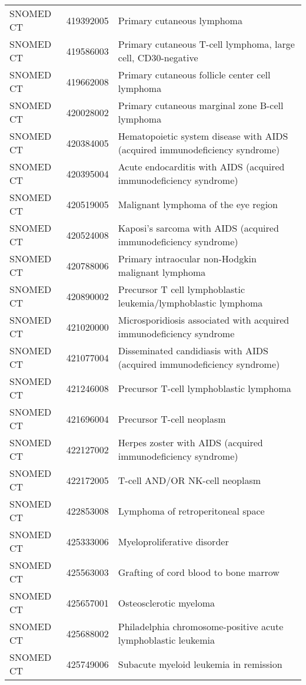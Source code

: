 \begin{table}[ht]
\begin{tabular}{lll}
  SNOMED CT & 419392005 & Primary cutaneous lymphoma \\ 
  SNOMED CT & 419586003 & Primary cutaneous T-cell lymphoma, large cell, CD30-negative \\ 
  SNOMED CT & 419662008 & Primary cutaneous follicle center cell lymphoma \\ 
  SNOMED CT & 420028002 & Primary cutaneous marginal zone B-cell lymphoma \\ 
  SNOMED CT & 420384005 & Hematopoietic system disease with AIDS (acquired immunodeficiency syndrome) \\ 
  SNOMED CT & 420395004 & Acute endocarditis with AIDS (acquired immunodeficiency syndrome) \\ 
  SNOMED CT & 420519005 & Malignant lymphoma of the eye region \\ 
  SNOMED CT & 420524008 & Kaposi's sarcoma with AIDS (acquired immunodeficiency syndrome) \\ 
  SNOMED CT & 420788006 & Primary intraocular non-Hodgkin malignant lymphoma \\ 
  SNOMED CT & 420890002 & Precursor T cell lymphoblastic leukemia/lymphoblastic lymphoma \\ 
  SNOMED CT & 421020000 & Microsporidiosis associated with acquired immunodeficiency syndrome \\ 
  SNOMED CT & 421077004 & Disseminated candidiasis with AIDS (acquired immunodeficiency syndrome) \\ 
  SNOMED CT & 421246008 & Precursor T-cell lymphoblastic lymphoma \\ 
  SNOMED CT & 421696004 & Precursor T-cell neoplasm \\ 
  SNOMED CT & 422127002 & Herpes zoster with AIDS (acquired immunodeficiency syndrome) \\ 
  SNOMED CT & 422172005 & T-cell AND/OR NK-cell neoplasm \\ 
  SNOMED CT & 422853008 & Lymphoma of retroperitoneal space \\ 
  SNOMED CT & 425333006 & Myeloproliferative disorder \\ 
  SNOMED CT & 425563003 & Grafting of cord blood to bone marrow \\ 
  SNOMED CT & 425657001 & Osteosclerotic myeloma \\ 
  SNOMED CT & 425688002 & Philadelphia chromosome-positive acute lymphoblastic leukemia \\ 
  SNOMED CT & 425749006 & Subacute myeloid leukemia in remission \\ 

\end{tabular}
\end{table}
